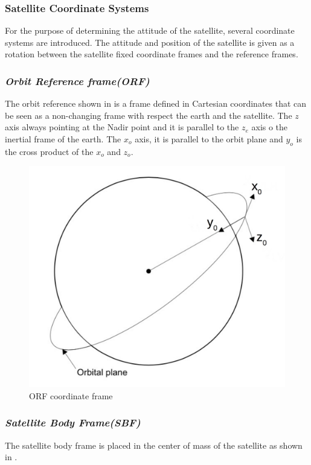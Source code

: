 \subsubsection{Satellite Coordinate Systems}
For the purpose of determining the attitude of the satellite, several coordinate systems are introduced. The attitude and position of the satellite is given as a rotation between the satellite fixed coordinate frames and the reference frames.
\subsubsection{\textit{Orbit Reference frame(ORF)}}
The orbit reference shown in  is a frame defined in Cartesian coordinates that can be seen as a non-changing frame with respect the earth and the satellite. The $z$ axis always pointing at the Nadir point and it is parallel to the $z_{e}$ axis o the inertial frame of the earth. The $x_{o}$ axis, it is parallel to the orbit plane and $y_{o}$ is the cross product of the $x_{o}$ and $z_{o}$. 
\begin{figure}[H]
	\centering
	\includegraphics[width=0.4\linewidth]{figures/OFR}
	\caption{ORF coordinate frame}
	\label{fig:OFR}
\end{figure}
\subsubsection{\textit{Satellite Body Frame(SBF)}}
The satellite body frame is placed in the center of mass of the satellite as shown in  . 

